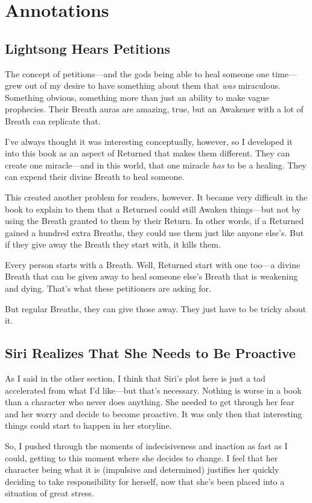 \section*{Annotations}

\subsection*{Lightsong Hears Petitions}

The concept of petitions—and the gods being able to heal someone one time—grew out of my desire to have something about them that \textit{was} miraculous. Something obvious, something more than just an ability to make vague prophecies. Their Breath auras are amazing, true, but an Awakener with a lot of Breath can replicate that.



I’ve always thought it was interesting conceptually, however, so I developed it into this book as an aspect of Returned that makes them different. They can create one miracle—and in this world, that one miracle \textit{has} to be a healing. They can expend their divine Breath to heal someone.

This created another problem for readers, however. It became very difficult in the book to explain to them that a Returned could still Awaken things—but not by using the Breath granted to them by their Return. In other words, if a Returned gained a hundred extra Breaths, they could use them just like anyone else’s. But if they give away the Breath they start with, it kills them.

Every person starts with a Breath. Well, Returned start with one too—a divine Breath that can be given away to heal someone else’s Breath that is weakening and dying. That’s what these petitioners are asking for.

But regular Breaths, they can give those away. They just have to be tricky about it.

\subsection*{Siri Realizes That She Needs to Be Proactive}

As I said in the other section, I think that Siri’s plot here is just a tad accelerated from what I’d like—but that’s necessary. Nothing is worse in a book than a character who never does anything. She needed to get through her fear and her worry and decide to become proactive. It was only then that interesting things could start to happen in her storyline.

So, I pushed through the moments of indecisiveness and inaction as fast as I could, getting to this moment where she decides to change. I feel that her character being what it is (impulsive and determined) justifies her quickly deciding to take responsibility for herself, now that she’s been placed into a situation of great stress.



